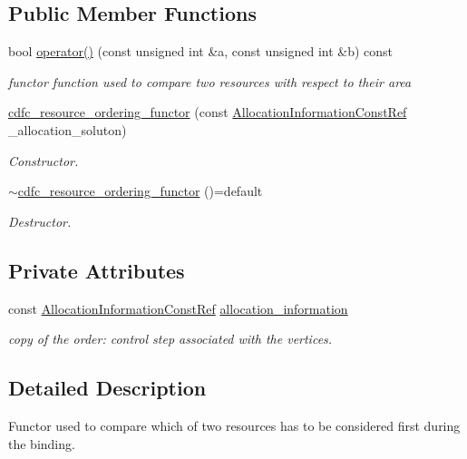 \subsection*{Public Member Functions}
\begin{DoxyCompactItemize}
\item 
bool \hyperlink{structcdfc__resource__ordering__functor_ad09f8b3eebdf4a355cba1eeae2df6993}{operator()} (const unsigned int \&a, const unsigned int \&b) const
\begin{DoxyCompactList}\small\item\em functor function used to compare two resources with respect to their area \end{DoxyCompactList}\item 
\hyperlink{structcdfc__resource__ordering__functor_a9914668df625db1a092b449e6b7c5b40}{cdfc\+\_\+resource\+\_\+ordering\+\_\+functor} (const \hyperlink{allocation__information_8hpp_a54287618a63bf87e31ddb17ba01e7ca7}{Allocation\+Information\+Const\+Ref} \+\_\+allocation\+\_\+soluton)
\begin{DoxyCompactList}\small\item\em Constructor. \end{DoxyCompactList}\item 
\hyperlink{structcdfc__resource__ordering__functor_a0cd7ca364d77caff48bcca4d0d26755a}{$\sim$cdfc\+\_\+resource\+\_\+ordering\+\_\+functor} ()=default
\begin{DoxyCompactList}\small\item\em Destructor. \end{DoxyCompactList}\end{DoxyCompactItemize}
\subsection*{Private Attributes}
\begin{DoxyCompactItemize}
\item 
const \hyperlink{allocation__information_8hpp_a54287618a63bf87e31ddb17ba01e7ca7}{Allocation\+Information\+Const\+Ref} \hyperlink{structcdfc__resource__ordering__functor_a5249d5b44b4c250637ff156eccc7fb45}{allocation\+\_\+information}
\begin{DoxyCompactList}\small\item\em copy of the order\+: control step associated with the vertices. \end{DoxyCompactList}\end{DoxyCompactItemize}


\subsection{Detailed Description}
Functor used to compare which of two resources has to be considered first during the binding. 

